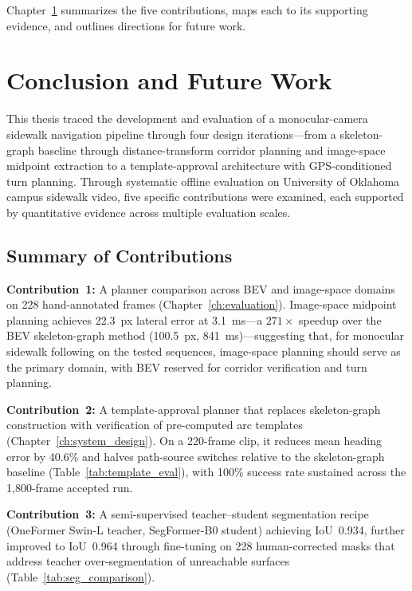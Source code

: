 \documentclass[12pt,letterpaper,oneside]{report}
\begin{document}
Chapter~\ref{ch:conclusion} summarizes the five contributions, maps each to its supporting evidence, and outlines directions for future work.


\chapter{Conclusion and Future Work}
\label{ch:conclusion}

This thesis traced the development and evaluation of a monocular-camera sidewalk navigation pipeline through four design iterations---from a skeleton-graph baseline through distance-transform corridor planning and image-space midpoint extraction to a template-approval architecture with GPS-conditioned turn planning.  Through systematic offline evaluation on University of Oklahoma campus sidewalk video, five specific contributions were examined, each supported by quantitative evidence across multiple evaluation scales.


\section{Summary of Contributions}

\textbf{Contribution~1:} A planner comparison across BEV and image-space domains on 228 hand-annotated frames (Chapter~\ref{ch:evaluation}).  Image-space midpoint planning achieves 22.3~px lateral error at 3.1~ms---a $271\times$ speedup over the BEV skeleton-graph method (100.5~px, 841~ms)---suggesting that, for monocular sidewalk following on the tested sequences, image-space planning should serve as the primary domain, with BEV reserved for corridor verification and turn planning.

\textbf{Contribution~2:} A template-approval planner that replaces skeleton-graph construction with verification of pre-computed arc templates (Chapter~\ref{ch:system_design}).  On a 220-frame clip, it reduces mean heading error by 40.6\% and halves path-source switches relative to the skeleton-graph baseline (Table~\ref{tab:template_eval}), with 100\% success rate sustained across the 1,800-frame accepted run.

\textbf{Contribution~3:} A semi-supervised teacher--student segmentation recipe (OneFormer Swin-L teacher, SegFormer-B0 student) achieving IoU~0.934, further improved to IoU~0.964 through fine-tuning on 228 human-corrected masks that address teacher over-segmentation of unreachable surfaces (Table~\ref{tab:seg_comparison}).
\end{document}
